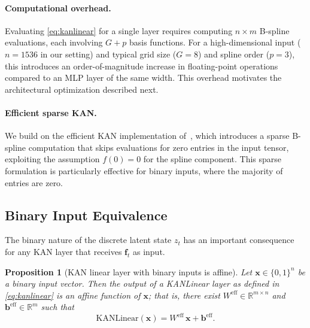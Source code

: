 \documentclass[11pt, a4paper]{article}
\newtheorem{proposition}{Proposition}
\begin{document}
\paragraph{Computational overhead.}
Evaluating \eqref{eq:kanlinear} for a single layer requires computing $n \times
m$ B-spline evaluations, each involving $G + p$ basis functions. For a
high-dimensional input ($n = 1536$ in our setting) and typical grid size
($G = 8$) and spline order ($p = 3$), this introduces an order-of-magnitude
increase in floating-point operations compared to an MLP layer of the same
width. This overhead motivates the architectural optimization described next.

\paragraph{Efficient sparse KAN.}
We build on the efficient KAN implementation of~\cite{blealtan2024}, which
introduces a sparse B-spline computation that skips evaluations for zero entries
in the input tensor, exploiting the assumption $f(0) = 0$ for the spline
component. This sparse formulation is particularly effective for binary inputs,
where the majority of entries are zero.

\subsection{Binary Input Equivalence}

The binary nature of the discrete latent state $z_t$ has an important
consequence for any KAN layer that receives $\mathbf{f}_t$ as input.

\begin{proposition}[KAN linear layer with binary inputs is affine]
  \label{prop:binary-equivalence}
  Let $\mathbf{x} \in \{0,1\}^n$ be a binary input vector. Then the output of
  a KANLinear layer as defined in \eqref{eq:kanlinear} is an affine function of
  $\mathbf{x}$; that is, there exist $W^{\mathrm{eff}} \in \mathbb{R}^{m \times n}$
  and $\mathbf{b}^{\mathrm{eff}} \in \mathbb{R}^m$ such that
  \begin{equation}
    \mathrm{KANLinear}(\mathbf{x}) = W^{\mathrm{eff}}\, \mathbf{x} + \mathbf{b}^{\mathrm{eff}}.
  \end{equation}
\end{proposition}
\end{document}
